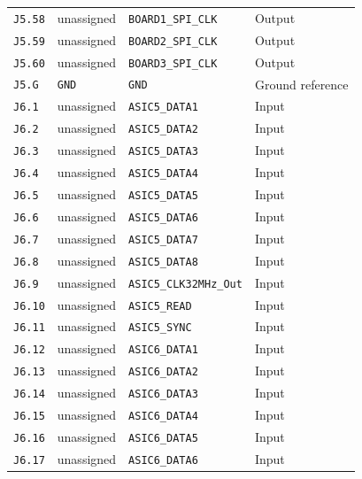 \documentclass[11pt,a4paper]{article}
\begin{document}
\begin{longtable}{@{}P{19mm}P{36mm}P{78mm}P{33mm}@{}}
\nolinkurl{J5.58} & \textcolor{muted}{unassigned} & \nolinkurl{BOARD1_SPI_CLK} & Output \\
\nolinkurl{J5.59} & \textcolor{muted}{unassigned} & \nolinkurl{BOARD2_SPI_CLK} & Output \\
\nolinkurl{J5.60} & \textcolor{muted}{unassigned} & \nolinkurl{BOARD3_SPI_CLK} & Output \\
\nolinkurl{J5.G} & \nolinkurl{GND} & \nolinkurl{GND} & Ground reference \\
\nolinkurl{J6.1} & \textcolor{muted}{unassigned} & \nolinkurl{ASIC5_DATA1} & Input \\
\nolinkurl{J6.2} & \textcolor{muted}{unassigned} & \nolinkurl{ASIC5_DATA2} & Input \\
\nolinkurl{J6.3} & \textcolor{muted}{unassigned} & \nolinkurl{ASIC5_DATA3} & Input \\
\nolinkurl{J6.4} & \textcolor{muted}{unassigned} & \nolinkurl{ASIC5_DATA4} & Input \\
\nolinkurl{J6.5} & \textcolor{muted}{unassigned} & \nolinkurl{ASIC5_DATA5} & Input \\
\nolinkurl{J6.6} & \textcolor{muted}{unassigned} & \nolinkurl{ASIC5_DATA6} & Input \\
\nolinkurl{J6.7} & \textcolor{muted}{unassigned} & \nolinkurl{ASIC5_DATA7} & Input \\
\nolinkurl{J6.8} & \textcolor{muted}{unassigned} & \nolinkurl{ASIC5_DATA8} & Input \\
\nolinkurl{J6.9} & \textcolor{muted}{unassigned} & \nolinkurl{ASIC5_CLK32MHz_Out} & Input \\
\nolinkurl{J6.10} & \textcolor{muted}{unassigned} & \nolinkurl{ASIC5_READ} & Input \\
\nolinkurl{J6.11} & \textcolor{muted}{unassigned} & \nolinkurl{ASIC5_SYNC} & Input \\
\nolinkurl{J6.12} & \textcolor{muted}{unassigned} & \nolinkurl{ASIC6_DATA1} & Input \\
\nolinkurl{J6.13} & \textcolor{muted}{unassigned} & \nolinkurl{ASIC6_DATA2} & Input \\
\nolinkurl{J6.14} & \textcolor{muted}{unassigned} & \nolinkurl{ASIC6_DATA3} & Input \\
\nolinkurl{J6.15} & \textcolor{muted}{unassigned} & \nolinkurl{ASIC6_DATA4} & Input \\
\nolinkurl{J6.16} & \textcolor{muted}{unassigned} & \nolinkurl{ASIC6_DATA5} & Input \\
\nolinkurl{J6.17} & \textcolor{muted}{unassigned} & \nolinkurl{ASIC6_DATA6} & Input \\

\end{longtable}
\end{document}
